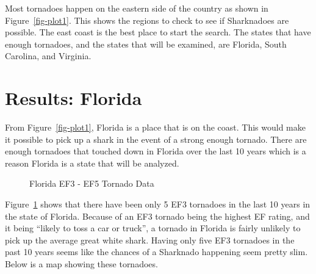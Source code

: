 \documentclass[
  letterpaper,
  DIV=11,
  numbers=noendperiod]{scrreprt}
\begin{document}
Most tornadoes happen on the eastern side of the country as shown in
Figure~\ref{fig-plot1}. This shows the regions to check to see if
Sharknadoes are possible. The east coast is the best place to start the
search. The states that have enough tornadoes, and the states that will
be examined, are Florida, South Carolina, and Virginia.

\section{Results: Florida}\label{results-florida-1}

From Figure~\ref{fig-plot1}, Florida is a place that is on the coast.
This would make it possible to pick up a shark in the event of a strong
enough tornado. There are enough tornadoes that touched down in Florida
over the last 10 years which is a reason Florida is a state that will be
analyzed.

\begin{figure}


\caption{\label{fig-table1}Florida EF3 - EF5 Tornado Data}

\end{figure}%

Figure~\ref{fig-table1} shows that there have been only 5 EF3 tornadoes
in the last 10 years in the state of Florida. Because of an EF3 tornado
being the highest EF rating, and it being ``likely to toss a car or
truck'', a tornado in Florida is fairly unlikely to pick up the average
great white shark. Having only five EF3 tornadoes in the past 10 years
seems like the chances of a Sharknado happening seem pretty slim. Below
is a map showing these tornadoes.
\end{document}
